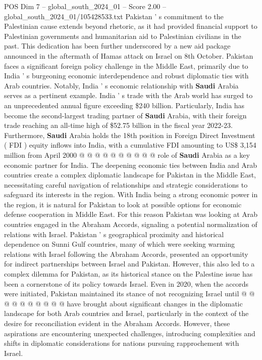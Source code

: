 \begin{textsample}{POS Dim 7 – global\_south\_2024\_01 – Score 2.00 – global\_south\_2024\_01/105428533.txt}
Pakistan ' s commitment to the Palestinian cause extends beyond rhetoric, as it had provided financial support to Palestinian governments and humanitarian aid to Palestinian civilians in the past.
This dedication has been further underscored by a new aid package announced in the aftermath of Hamas attack on Israel on 8th October.
Pakistan faces a significant foreign policy challenge in the Middle East, primarily due to India ' s burgeoning economic interdependence and robust diplomatic ties with Arab countries.
Notably, India ' s economic relationship with \textbf{Saudi} Arabia serves as a pertinent example.
India ' s trade with the Arab world has surged to an unprecedented annual figure exceeding \$240 billion.
Particularly, India has become the second-largest trading partner of \textbf{Saudi} Arabia, with their foreign trade reaching an all-time high of \$52.75 billion in the fiscal year 2022-23.
Furthermore, \textbf{Saudi} Arabia holds the 18th position in Foreign Direct Investment ( FDI ) equity inflows into India, with a cumulative FDI amounting to US\$ 3,154 million from April 2000 @ @ @ @ @ @ @ @ @ @ role of \textbf{Saudi} Arabia as a key economic partner for India.
The deepening economic ties between India and Arab countries create a complex diplomatic landscape for Pakistan in the Middle East, necessitating careful navigation of relationships and strategic considerations to safeguard its interests in the region.
With India being a strong economic power in the region, it is natural for Pakistan to look at possible options for economic defense cooperation in Middle East.
For this reason Pakistan was looking at Arab countries engaged in the Abraham Accords, signaling a potential normalization of relations with Israel.
Pakistan ' s geographical proximity and historical dependence on Sunni Gulf countries, many of which were seeking warming relations with Israel following the Abraham Accords, presented an opportunity for indirect partnerships between Israel and Pakistan.
However, this also led to a complex dilemma for Pakistan, as its historical stance on the Palestine issue has been a cornerstone of its policy towards Israel.
Even in 2020, when the accords were initiated, Pakistan maintained its stance of not recognizing Israel until @ @ @ @ @ @ @ @ @ @ have brought about significant changes in the diplomatic landscape for both Arab countries and Israel, particularly in the context of the desire for reconciliation evident in the Abraham Accords.
However, these aspirations are encountering unexpected challenges, introducing complexities and shifts in diplomatic considerations for nations pursuing rapprochement with Israel.

\end{textsample}
